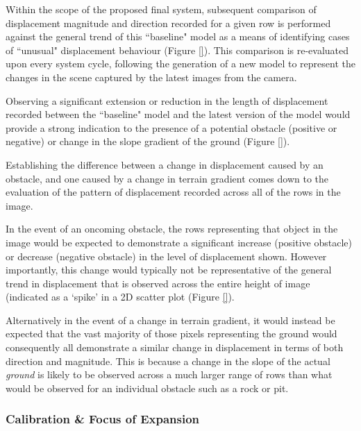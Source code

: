 Within the scope of the proposed final system, subsequent comparison of displacement magnitude and direction recorded for a given row is performed against the general trend of this ``baseline" model as a means of identifying cases of ``unusual" displacement behaviour (Figure \ref{}). This comparison is re-evaluated upon every system cycle, following the generation of a new model to represent the changes in the scene captured by the latest images from the camera. 

Observing a significant extension or reduction in the length of displacement recorded between the ``baseline" model and the latest version of the model would provide a strong indication to the presence of a potential obstacle (positive or negative) or change in the slope gradient of the ground (Figure \ref{}).

  
 Establishing the difference between a change in displacement caused by an obstacle, and one caused by a change in terrain gradient comes down to the evaluation of the pattern of displacement recorded across all of the rows in the image.
 
In the event of an oncoming obstacle, the rows representing that object in the image would be expected to demonstrate a significant increase (positive obstacle) or decrease (negative obstacle) in the level of displacement shown. However importantly, this change would typically not be representative of the general trend in displacement that is observed across the entire height of image (indicated as a `spike' in a 2D scatter plot (Figure \ref{}). 

 
 Alternatively in the event of a change in terrain gradient, it would instead be expected that the vast majority of those pixels representing the ground would consequently all demonstrate a similar change in displacement in terms of both direction and magnitude. This is because a change in the slope of the actual \textit{ground} is likely to be observed across a much larger range of rows than what would be observed for an individual obstacle such as a rock or pit.
 
\subsubsection{Calibration \& Focus of Expansion}
\label{hypo-calib}

